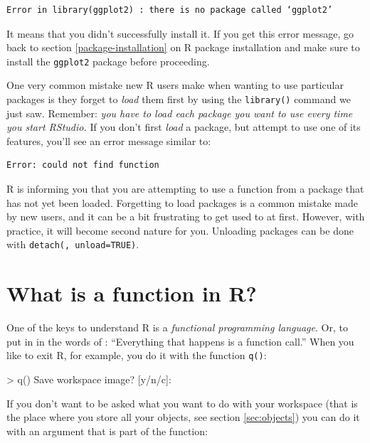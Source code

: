 \documentclass[
  12pt,
  oneside]{book}
\newenvironment{Shaded}{\begin{snugshade}}{\end{snugshade}}
\newcommand{\NormalTok}[1]{#1}
\theoremstyle{definition}
\theoremstyle{definition}
\theoremstyle{definition}
\theoremstyle{definition}
\theoremstyle{remark}
\begin{document}
\begin{verbatim}
Error in library(ggplot2) : there is no package called ‘ggplot2’
\end{verbatim}

It means that you didn't successfully install it. If you get this error message, go back to section \ref{package-installation} on R package installation and make sure to install the \texttt{ggplot2} package before proceeding.

One very common mistake new R users make when wanting to use particular packages is they forget to \emph{load} them first by using the \texttt{library()} command we just saw. Remember: \emph{you have to load each package you want to use every time you start RStudio.} If you don't first \emph{load} a package, but attempt to use one of its features, you'll see an error message similar to:

\begin{verbatim}
Error: could not find function
\end{verbatim}

R is informing you that you are attempting to use a function from a package that has not yet been loaded. Forgetting to load packages is a common mistake made by new users, and it can be a bit frustrating to get used to at first. However, with practice, it will become second nature for you.
Unloading packages can be done with \texttt{detach(,\ unload=TRUE)}.

\hypertarget{what-is-a-function-in-r}{%
\section{What is a function in R?}\label{what-is-a-function-in-r}}

One of the keys to understand R is a \emph{functional programming language}. Or, to put in in the words of \citet[p.~4]{Chambers2017Extending}: ``Everything that happens is a function call.'' When you like to exit R, for example, you do it with the function \texttt{q()}:

\begin{Shaded}
\begin{Highlighting}[]
\NormalTok{\textgreater{} q()}
\NormalTok{Save workspace image? [y/n/c]: }
\end{Highlighting}
\end{Shaded}

If you don't want to be asked what you want to do with your workspace (that is the place where you store all your objects, see section \ref{sec:objects}) you can do it with an argument that is part of the function:
\end{document}
